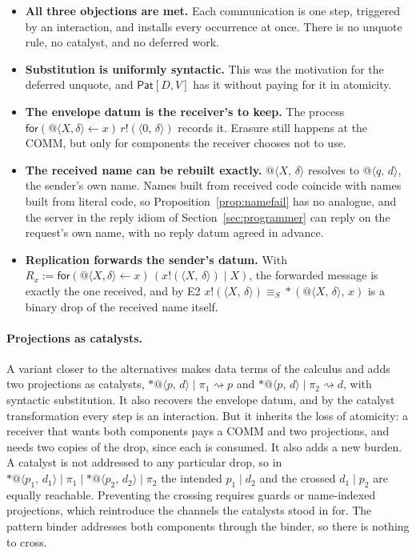 \documentclass[11pt,a4paper]{article}
\makeatletter
\theoremstyle{plain}
\theoremstyle{definition}
\theoremstyle{remark}
\newcommand{\pr}[2]{\langle #1,\,#2\rangle}
\newcommand{\qn}[2]{@\langle #1,\,#2\rangle}
\newcommand{\out}[2]{#1!(#2)}
\newcommand{\rcv}[3]{\mathsf{for}(#1 \leftarrow #2)\,#3}
\newcommand{\drop}[1]{{*}#1}
\newcommand{\bdrop}[2]{{*}(#1,\,#2)}
\newcommand{\red}{\rightsquigarrow}
\newcommand{\scong}{\equiv_{S}}
\newcommand{\Pat}{\textsf{Pat}[D,V]}
\makeatother
\begin{document}
\begin{itemize}[leftmargin=1.5em]
\item \textbf{All three objections are met.} Each communication is one step,
  triggered by an interaction, and installs every occurrence at once. There
  is no unquote rule, no catalyst, and no deferred work.
\item \textbf{Substitution is uniformly syntactic.} This was the motivation
  for the deferred unquote, and $\Pat$ has it without paying for it in
  atomicity.
\item \textbf{The envelope datum is the receiver's to keep.} The process
  $\rcv{@\langle X,\delta\rangle}{x}{\out{r}{\pr{0}{\delta}}}$ records it.
  Erasure still happens at the COMM, but only for components the receiver
  chooses not to use.
\item \textbf{The received name can be rebuilt exactly.} $\qn{X}{\delta}$
  resolves to $\qn{q}{d}$, the sender's own name. Names built from received
  code coincide with names built from literal code, so
  Proposition~\ref{prop:namefail} has no analogue, and the server in the
  reply idiom of Section~\ref{sec:programmer} can reply on the request's own
  name, with no reply datum agreed in advance.
\item \textbf{Replication forwards the sender's datum.} With
  $R_x := \rcv{@\langle X,\delta\rangle}{x}{(\out{x}{\pr{X}{\delta}}\mid X)}$,
  the forwarded message is exactly the one received, and by E2
  $\out{x}{\pr{X}{\delta}}\scong\bdrop{\qn{X}{\delta}}{x}$ is a binary drop of
  the received name itself.
\end{itemize}

\paragraph{Projections as catalysts.} A variant closer to the alternatives
makes data terms of the calculus and adds two projections as catalysts,
$\drop{\qn{p}{d}}\mid\pi_1\red p$ and $\drop{\qn{p}{d}}\mid\pi_2\red d$, with
syntactic substitution. It also recovers the envelope datum, and by the
catalyst transformation every step is an interaction. But it inherits the loss
of atomicity: a receiver that wants both components pays a COMM and two
projections, and needs two copies of the drop, since each is consumed. It also
adds a new burden. A catalyst is not addressed to any particular drop, so in
$\drop{\qn{p_1}{d_1}}\mid\pi_1\mid\drop{\qn{p_2}{d_2}}\mid\pi_2$ the intended
$p_1\mid d_2$ and the crossed $d_1\mid p_2$ are equally reachable. Preventing
the crossing requires guards or name-indexed projections, which reintroduce
the channels the catalysts stood in for. The pattern binder addresses both
components through the binder, so there is nothing to cross.
\end{document}
